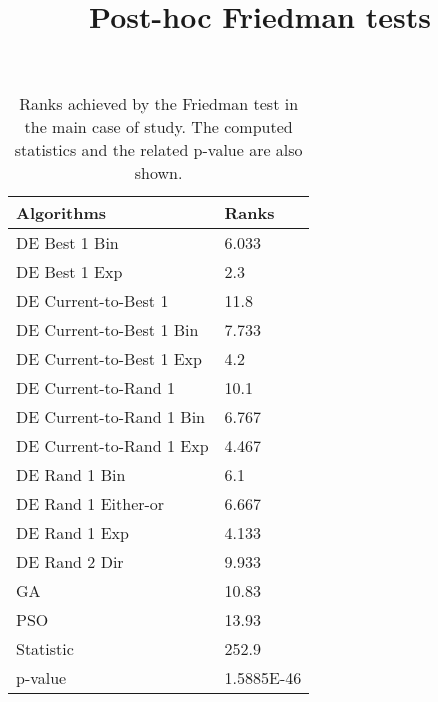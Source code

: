 \documentclass{article}
\begin{document}
 \title{Post-hoc Friedman tests}
 \maketitle
\begin{table}[tb]
 \begin{center}
  \caption{Ranks achieved by the Friedman test in the main case of study. The computed statistics and the related p-value are also shown.}\label{tb:ranks}
          \footnotesize
          \begin{tabular}{ll}
          Algorithms & Ranks \\ \hline 
DE Best 1 Bin  &  6.033 \\ 
DE Best 1 Exp  &    2.3 \\ 
DE Current-to-Best 1  &   11.8 \\ 
DE Current-to-Best 1 Bin  &  7.733 \\ 
DE Current-to-Best 1 Exp  &    4.2 \\ 
DE Current-to-Rand 1  &   10.1 \\ 
DE Current-to-Rand 1 Bin  &  6.767 \\ 
DE Current-to-Rand 1 Exp  &  4.467 \\ 
DE Rand 1 Bin  &    6.1 \\ 
DE Rand 1 Either-or  &  6.667 \\ 
DE Rand 1 Exp  &  4.133 \\ 
DE Rand 2 Dir  &  9.933 \\ 
GA  &  10.83 \\ 
PSO  &  13.93 \\ 
\hline
 Statistic &  252.9 \\ 
p-value &  1.5885E-46 \\ 
\end{tabular}
 \end{center}
 \end{table}
\end{document}
